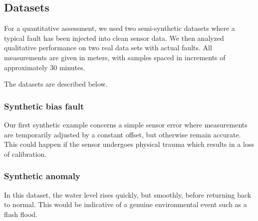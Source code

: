 \documentclass{article}
\begin{document}
\subsection{Datasets}

For a quantitative assessment, we used two semi-synthetic datasets
where a typical fault has been injected into clean sensor data. We
then analyzed qualitative performance on two real data sets with actual
faults. All measurements are given in meters, with samples spaced in
increments of approximately 30 minutes.



The datasets are described below.

\subsubsection{Synthetic bias fault}
Our first synthetic example concerns a simple sensor error where
measurements are temporarily adjusted by a constant offset, but
otherwise remain accurate. This could happen if the sensor undergoes
physical trauma which results in a loss of calibration.

\subsubsection{Synthetic anomaly}
In this dataset, the water level rises quickly, but smoothly, before
returning back to normal. This would be indicative of a genuine
environmental event such as a flash flood.
\end{document}
